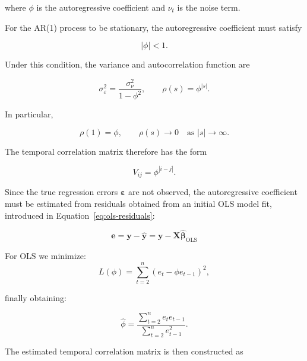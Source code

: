 where $\phi$ is the autoregressive coefficient and $\nu_t$ is the noise term.

For the AR(1) process to be stationary, the autoregressive coefficient must satisfy

\begin{equation}
    |\phi| < 1.
    \label{eq:ar1-stationarity}
\end{equation}

Under this condition, the variance and autocorrelation function are

\begin{equation}
    \sigma_\varepsilon^2 = \frac{\sigma_\nu^2}{1-\phi^2}, \qquad \rho(s) = \phi^{|s|}.
    \label{eq:ar1-autocorrelation}
\end{equation}

In particular,

\begin{equation}
    \rho(1)=\phi, \qquad \rho(s) \longrightarrow 0 \quad \text{as } |s|\longrightarrow\infty.
\end{equation}

The temporal correlation matrix therefore has the form

\begin{equation}
    V_{ij} = \phi^{|i-j|}.
    \label{eq:ar-covariance-elements}
\end{equation}

Since the true regression errors $\boldsymbol{\varepsilon}$ are not observed, the autoregressive coefficient must be estimated from residuals obtained from an initial OLS model fit, introduced in Equation~\ref{eq:ols-residuals}:

\begin{equation}
    \mathbf{e} = \mathbf{y}-\widehat{\mathbf{y}} = \mathbf{y} - \mathbf{X}\widehat{\boldsymbol{\beta}}_{\mathrm{OLS}}
\end{equation}

For OLS we minimize:
\begin{equation}
    L(\phi) = \sum_{t=2}^{n} (e_t - \phi e_{t-1})^2,
\end{equation}

finally obtaining:

\begin{equation}
    \widehat{\phi} = \frac{\sum_{t=2}^{n} e_t e_{t-1} }{\sum_{t=2}^{n}e_{t-1}^2 }.
    \label{eq:ar1-phi-estimator}
\end{equation}

The estimated temporal correlation matrix is then constructed as

